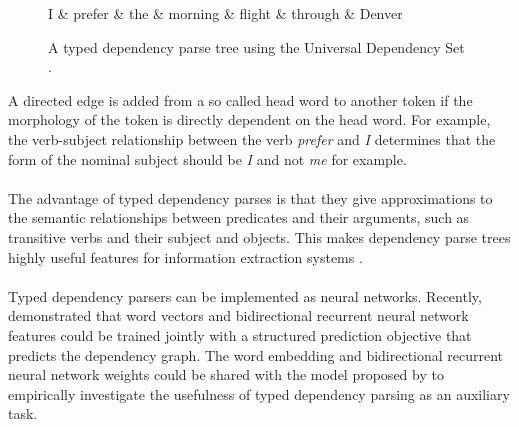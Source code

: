 \begin{figure}[h]
\centering
\begin{dependency}[theme = simple]
   \begin{deptext}[column sep=1em]
   I \& prefer \& the \& morning \& flight \& through \& Denver \\
   \end{deptext}
\end{dependency}
\caption{A typed dependency parse tree using the Universal Dependency Set \citep{demarneffe2014}.}
\label{dependency}
\end{figure}
\noindent
A directed edge is added from a so called head word to another token if the morphology of the token is directly dependent on the head word. For example, the verb-subject relationship between the verb \textit{prefer} and \textit{I} determines that the form of the nominal subject should be \textit{I} and not \textit{me} for example.
\\\\
The advantage of typed dependency parses is that they give approximations to the semantic relationships between predicates and their arguments, such as transitive verbs and their subject and objects. This makes dependency parse trees highly useful features for information extraction systems \citep{jurafsky09}.
\\\\
Typed dependency parsers can be implemented as neural networks. Recently, \citet{kiperwasser2016} demonstrated that word vectors and bidirectional recurrent neural network features could be trained jointly with a structured prediction objective that predicts the dependency graph. The word embedding and bidirectional recurrent neural network weights could be shared with the model proposed by \citet{zhang2015} to empirically investigate the usefulness of typed dependency parsing as an auxiliary task.

